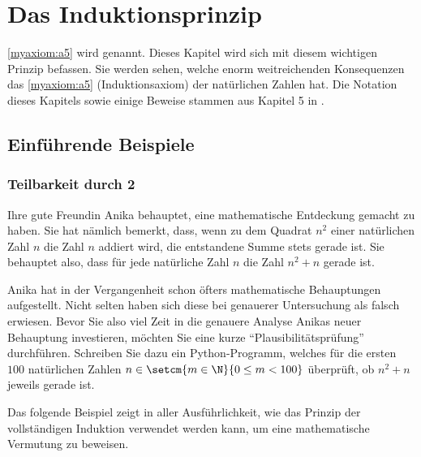 \chapter{Das Induktionsprinzip}\label{ch:Kapitel02}

\cref{myaxiom:a5} wird  genannt. Dieses Kapitel wird sich mit diesem wichtigen Prinzip befassen.
Sie werden sehen, welche enorm weitreichenden Konsequenzen das \cref{myaxiom:a5} (Induktionsaxiom) der natürlichen Zahlen hat. Die Notation dieses Kapitels sowie einige Beweise stammen aus Kapitel 5 in \cite{AmannEscher1}.

\section{Einführende Beispiele}

\subsection{Teilbarkeit durch 2}
Ihre gute Freundin Anika behauptet, eine mathematische Entdeckung gemacht zu haben. Sie hat nämlich bemerkt, dass, wenn zu dem Quadrat $n^2$ einer natürlichen Zahl $n$ die Zahl $n$ addiert wird, die entstandene Summe stets gerade ist. Sie behauptet also, dass für jede natürliche Zahl $n$ die Zahl $n^2+n$ gerade ist.

\begin{myexercise}\label{myexercise:0200}
	Anika hat in der Vergangenheit schon öfters mathematische Behauptungen aufgestellt. Nicht selten haben sich diese bei genauerer Untersuchung als falsch erwiesen. Bevor Sie also viel Zeit in die genauere Analyse Anikas neuer Behauptung investieren, möchten Sie eine kurze \enquote{Plausibilitätsprüfung} durchführen. Schreiben Sie dazu ein Python-Programm, welches für die ersten $100$ natürlichen Zahlen $n\in\setcm{m\in\N}{0\leq m < 100}$ überprüft, ob $n^2+n$ jeweils gerade ist.
\end{myexercise}
\noindent
Das folgende Beispiel zeigt in aller Ausführlichkeit, wie das Prinzip der vollständigen Induktion verwendet werden kann, um eine mathematische Vermutung zu beweisen.

